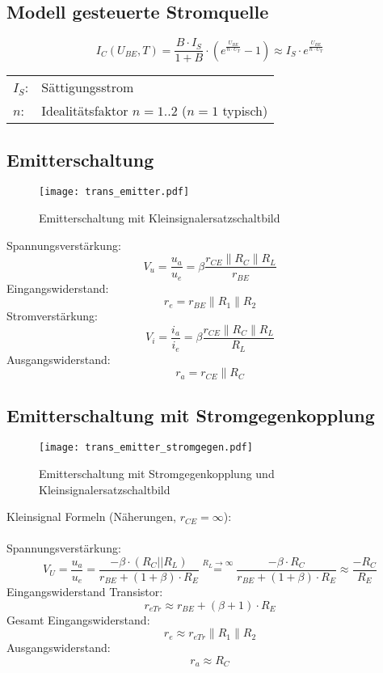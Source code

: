 \subsection{Modell gesteuerte Stromquelle}
\[ I_C(U_{BE}, T) = \frac{B \cdot I_S}{1 + B} 
\cdot \left(e^{\frac{U_{BE}}{n \cdot U_T}} - 1\right) 
\approx I_S \cdot e^{\frac{U_{BE}}{n \cdot U_T}} \]
\begin{tabular}{@{}ll}
  $I_S$:	    & Sättigungsstrom \\
  $n$:	        & Idealitätsfaktor $n = 1..2$ ($n = 1$ typisch) \\
\end{tabular}

\subsection{Emitterschaltung}
\begin{figure}[h!]
	\centering
	\texttt{[image: trans\_emitter.pdf]}
	\caption{Emitterschaltung mit Kleinsignalersatzschaltbild}
	\label{trans:emitterschaltung}
\end{figure}
\noindent
Spannungsverstärkung:
\[
	V_u = \frac{u_a}{u_e} = \beta \frac{r_{CE} \parallel R_C \parallel R_L}{r_{BE}}
\]
Eingangswiderstand:
\[
	r_e = r_{BE} \parallel R_1 \parallel R_2
\]
Stromverstärkung:
\[
	V_i = \frac{i_a}{i_e} = \beta \frac{r_{CE} \parallel R_C \parallel R_L}{R_L}
\]
Ausgangswiderstand:
\[
	r_a = r_{CE} \parallel R_C
\]

\subsection{Emitterschaltung mit Stromgegenkopplung}
\begin{figure}[h!]
	\centering
	\texttt{[image: trans\_emitter\_stromgegen.pdf]}
	\caption{Emitterschaltung mit Stromgegenkopplung und Kleinsignalersatzschaltbild}
	\label{trans:emitterschaltung_sgk}
\end{figure}
\noindent
Kleinsignal Formeln (Näherungen, $r_{CE} = \infty$):
\\\\
Spannungsverstärkung:
\[
	V_U = \frac{u_a}{u_e} = \frac{-\beta \cdot (R_C || R_L)}{r_{BE} + (1 + \beta) \cdot R_E} \stackrel{R_L \to \infty}{=} \frac{-\beta \cdot R_C}{r_{BE} + (1 + \beta) \cdot R_E} \approx \frac{-R_C}{R_E}
\]
Eingangswiderstand Transistor:
\[
	r_{eTr} \approx r_{BE} + (\beta + 1) \cdot R_E
\]
Gesamt Eingangswiderstand:
\[
	r_e \approx r_{eTr} \parallel R_1 \parallel R_2
\]
Ausgangswiderstand:
\[
	r_a \approx R_C
\]

